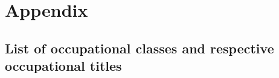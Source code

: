 \documentclass[
10pt, %
a4paper, %
oneside, %
headinclude,footinclude, %
] {book}%
\begin{document}

 



\newpage
\appendix
\chapter{Appendix}
\section{List of occupational classes and respective occupational titles}


\newpage
\end{document}

